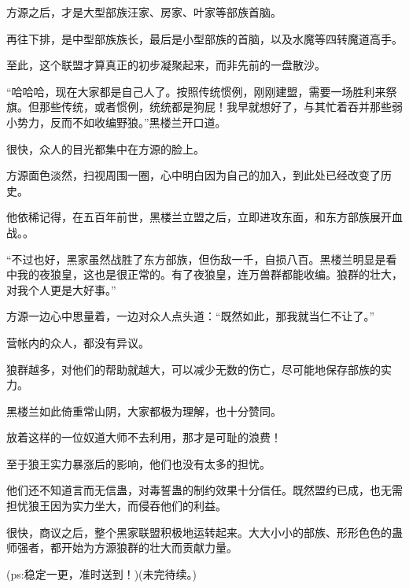 \begin{this_body}
方源之后，才是大型部族汪家、房家、叶家等部族首脑。

再往下排，是中型部族族长，最后是小型部族的首脑，以及水魔等四转魔道高手。

至此，这个联盟才算真正的初步凝聚起来，而非先前的一盘散沙。

“哈哈哈，现在大家都是自己人了。按照传统惯例，刚刚建盟，需要一场胜利来祭旗。但那些传统，或者惯例，统统都是狗屁！我早就想好了，与其忙着吞并那些弱小势力，反而不如收编野狼。”黑楼兰开口道。

很快，众人的目光都集中在方源的脸上。

方源面色淡然，扫视周围一圈，心中明白因为自己的加入，到此处已经改变了历史。

他依稀记得，在五百年前世，黑楼兰立盟之后，立即进攻东面，和东方部族展开血战。。

“不过也好，黑家虽然战胜了东方部族，但伤敌一千，自损八百。黑楼兰明显是看中我的夜狼皇，这也是很正常的。有了夜狼皇，连万兽群都能收编。狼群的壮大，对我个人更是大好事。”

方源一边心中思量着，一边对众人点头道：“既然如此，那我就当仁不让了。”

营帐内的众人，都没有异议。

狼群越多，对他们的帮助就越大，可以减少无数的伤亡，尽可能地保存部族的实力。

黑楼兰如此倚重常山阴，大家都极为理解，也十分赞同。

放着这样的一位奴道大师不去利用，那才是可耻的浪费！

至于狼王实力暴涨后的影响，他们也没有太多的担忧。

他们还不知道言而无信蛊，对毒誓蛊的制约效果十分信任。既然盟约已成，也无需担忧狼王因为实力坐大，而侵吞他们的利益。

很快，商议之后，整个黑家联盟积极地运转起来。大大小小的部族、形形色色的蛊师强者，都开始为方源狼群的壮大而贡献力量。

(ps:稳定一更，准时送到！)(未完待续。)

\end{this_body}

